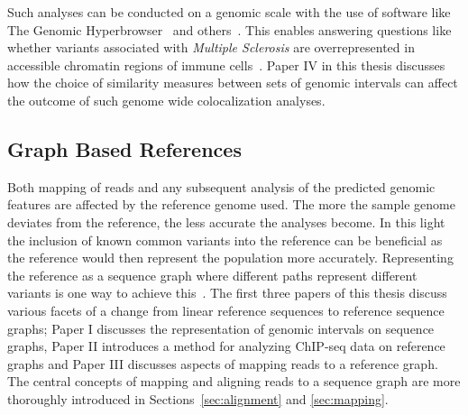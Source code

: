 Such analyses can be conducted on a genomic scale with the use of software like The Genomic Hyperbrowser~\cite{hyperbrowser} and others~\cite{colocstats, bedtools}.
This enables answering questions like whether variants associated with \emph{Multiple Sclerosis} are overrepresented in  accessible chromatin regions of immune cells~\cite{hbexample}.
Paper IV in this thesis discusses how the choice of similarity measures between sets of genomic intervals can affect the outcome of such genome wide colocalization analyses.

\subsection{Graph Based References}
Both mapping of reads and any subsequent analysis of the predicted genomic features are affected by the reference genome used.
The more the sample genome deviates from the reference, the less accurate the analyses become.
In this light the inclusion of known common variants into the reference can be beneficial as the reference would then represent the population more accurately.
Representing the reference as a sequence graph where different paths represent different variants is one way to achieve this~\cite{genomegraphs}.
The first three papers of this thesis discuss various facets of a change from linear reference sequences to reference sequence graphs; Paper I discusses the representation of genomic intervals on sequence graphs, Paper II introduces a method for analyzing ChIP-seq data on reference graphs and Paper III discusses aspects of mapping reads to a reference graph.
The central concepts of mapping and aligning reads to a sequence graph are more thoroughly introduced in Sections~\ref{sec:alignment} and \ref{sec:mapping}.


